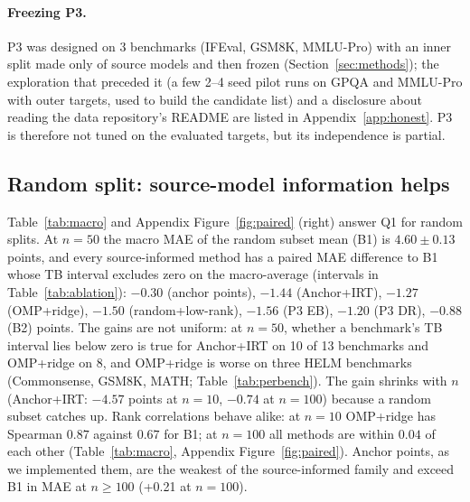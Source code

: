 \paragraph{Freezing P3.}
P3 was designed on 3 benchmarks (IFEval, GSM8K, MMLU-Pro) with an inner split made only of source models and then frozen (Section~\ref{sec:methods}); the exploration that preceded it (a few 2--4 seed pilot runs on GPQA and MMLU-Pro with outer targets, used to build the candidate list) and a disclosure about reading the data repository's README are listed in Appendix~\ref{app:honest}. P3 is therefore not tuned on the evaluated targets, but its independence is partial.

\subsection{Random split: source-model information helps}
Table~\ref{tab:macro} and Appendix Figure~\ref{fig:paired} (right) answer Q1 for random splits. At $n=50$ the macro MAE of the random subset mean (B1) is $4.60\pm0.13$ points, and every source-informed method has a paired MAE difference to B1 whose TB interval excludes zero on the macro-average (intervals in Table~\ref{tab:ablation}): $-0.30$ (anchor points), $-1.44$ (Anchor+IRT), $-1.27$ (OMP+ridge), $-1.50$ (random+low-rank), $-1.56$ (P3 EB), $-1.20$ (P3 DR), $-0.88$ (B2) points. The gains are not uniform: at $n{=}50$, whether a benchmark's TB interval lies below zero is true for Anchor+IRT on 10 of 13 benchmarks and OMP+ridge on 8, and OMP+ridge is worse on three HELM benchmarks (Commonsense, GSM8K, MATH; Table~\ref{tab:perbench}). The gain shrinks with $n$ (Anchor+IRT: $-4.57$ points at $n{=}10$, $-0.74$ at $n{=}100$) because a random subset catches up. Rank correlations behave alike: at $n{=}10$ OMP+ridge has Spearman $0.87$ against $0.67$ for B1; at $n{=}100$ all methods are within $0.04$ of each other (Table~\ref{tab:macro}, Appendix Figure~\ref{fig:paired}). Anchor points, as we implemented them, are the weakest of the source-informed family and exceed B1 in MAE at $n\ge100$ (+0.21 at $n{=}100$).

\begin{table}[t]
\caption{Macro-average over the 13 benchmarks of MAE (accuracy points) and Spearman correlation, mean $\pm$ half-width of the 95\% bootstrap interval over repetitions. Per-benchmark values in Appendix Table~\ref{tab:perbench}. Generated by \texttt{paper/make\_tables.py} from \texttt{figures/generated/}.}
\label{tab:macro}
\centering

\end{table}

